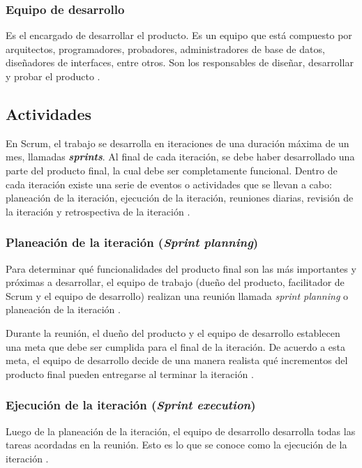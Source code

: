 \subsubsection{Equipo de desarrollo}

Es el encargado de desarrollar el producto. Es un equipo que está compuesto por arquitectos, programadores, probadores, administradores de base de datos, diseñadores de interfaces, entre otros. Son los responsables de diseñar, desarrollar y probar el producto \cite{SCRM12}. %

\subsection{Actividades}

En Scrum, el trabajo se desarrolla en iteraciones de una duración máxima de un mes, llamadas \textit{\textbf{sprints}}. Al final de cada iteración, se debe haber desarrollado una parte del producto final, la cual debe ser completamente funcional. Dentro de cada iteración existe una serie de eventos o actividades que se llevan a cabo: planeación de la iteración, ejecución de la iteración, reuniones diarias, revisión de la iteración y retrospectiva de la iteración \cite{SCRM12}.

\subsubsection{Planeación de la iteración (\textit{Sprint planning})}
Para determinar qué funcionalidades del producto final son las más importantes y próximas a desarrollar, el equipo de trabajo (dueño del producto, facilitador de Scrum y el equipo de desarrollo) realizan una reunión llamada \textit{sprint planning} o planeación de la iteración \cite{SCRM12}.

Durante la reunión, el dueño del producto y el equipo de desarrollo establecen una meta que debe ser cumplida para el final de la iteración. De acuerdo a esta meta, el equipo de desarrollo decide de una manera realista qué incrementos del producto final pueden entregarse al terminar la iteración \cite{SCRM12}.

\subsubsection{Ejecución de la iteración (\textit{Sprint execution})}

Luego de la planeación de la iteración, el equipo de desarrollo desarrolla todas las tareas acordadas en la reunión. Esto es lo que se conoce como la ejecución de la iteración \cite{SCRM12}.

